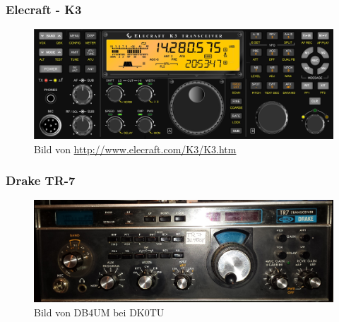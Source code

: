 \begin{frame}
  \frametitle{Elecraft - K3}
  \begin{center}
    \begin{figure}
      \includegraphics[width=1\textwidth,height=.75\textheight,keepaspectratio]{e15/K3_Front.jpg}
      \caption{Bild von \ExternalLink\url{http://www.elecraft.com/K3/K3.htm}}
    \end{figure}
  \end{center}
\end{frame}

\begin{frame}
  \frametitle{Drake TR-7}
  \begin{center}
    \begin{figure}
      \includegraphics[width=1\textwidth,height=.75\textheight,keepaspectratio]{e15/drake.jpg}
      \caption{Bild von DB4UM bei DK0TU}
    \end{figure}
  \end{center}
\end{frame}

